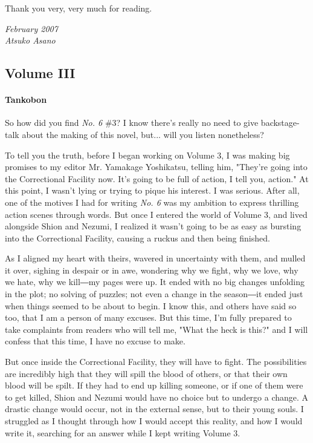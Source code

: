 Thank you very, very much for reading.

\myspace

\emph{February 2007\\
Atsuko Asano}

\subsection{Volume III}
\paragraph{Tankobon}

So how did you find \emph{No. 6} \#3? I know there's really no need to give
backstage-talk about the making of this novel, but... will you listen
nonetheless?

To tell you the truth, before I began working on Volume 3, I was making
big promises to my editor Mr. Yamakage Yoshikatsu, telling him, "They're
going into the Correctional Facility now. It's going to be full of
action, I tell you, action." At this point, I wasn't lying or trying to
pique his interest. I was serious. After all, one of the motives I had
for writing \emph{No. 6} was my ambition to express thrilling action scenes
through words. But once I entered the world of Volume 3, and lived
alongside Shion and Nezumi, I realized it wasn't going to be as easy as
bursting into the Correctional Facility, causing a ruckus and then being
finished.

As I aligned my heart with theirs, wavered in uncertainty with them, and
mulled it over, sighing in despair or in awe, wondering why we fight,
why we love, why we hate, why we kill―my pages were up. It ended with no
big changes unfolding in the plot; no solving of puzzles; not even a
change in the season―it ended just when things seemed to be about to
begin. I know this, and others have said so too, that I am a person of
many excuses. But this time, I'm fully prepared to take complaints from
readers who will tell me, "What the heck is this?" and I will confess
that this time, I have no excuse to make.

But once inside the Correctional Facility, they will have to fight. The
possibilities are incredibly high that they will spill the blood of
others, or that their own blood will be spilt. If they had to end up
killing someone, or if one of them were to get killed, Shion and Nezumi
would have no choice but to undergo a change. A drastic change would
occur, not in the external sense, but to their young souls. I struggled
as I thought through how I would accept this reality, and how I would
write it, searching for an answer while I kept writing Volume 3.

